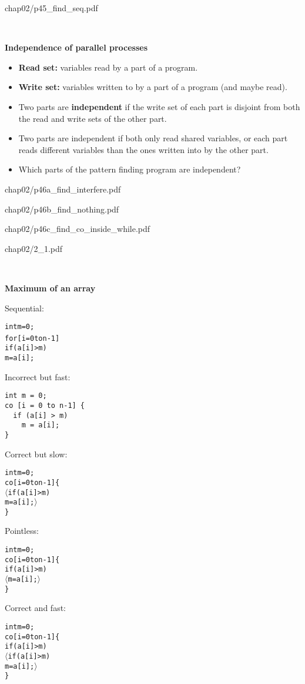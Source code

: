 \documentclass{article}
\newcommand{\lang}{\ensuremath{\langle}}
\newcommand{\rang}{\ensuremath{\rangle}}
\newcommand{\myfig}[1]{\begin{overpic}[scale=1.5]{#1}}
\newcommand{\myfigend}{\end{overpic}\newpage}
\newcommand{\bi}{\begin{itemize}}
\newcommand{\ii}{\item}
\newcommand{\ei}{\end{itemize}}
\newcommand{\ti}[1]{
\mbox{~}

\vspace{1.25in}
\centerline{\bf #1}}
\begin{document}
\newpage

\myfig{chap02/p45_find_seq.pdf}

\myfigend

\ti{Independence of parallel processes}
\bi
\ii {\bf Read set:}  variables read by a part of a program.
\ii {\bf Write set:}  variables written to by a part of a program (and
maybe read).
\ii Two parts are {\bf independent} if the write set of each part is
disjoint from both the read and write sets of the other part.
\ii Two parts are independent if both only read shared variables, or
each part reads different variables than the ones written into by the
other part.
\ii Which parts of the pattern finding program are independent?
\ei


\newpage
\myfig{chap02/p46a_find_interfere.pdf}
\myfigend
\myfig{chap02/p46b_find_nothing.pdf}
\myfigend
\myfig{chap02/p46c_find_co_inside_while.pdf}
\myfigend
\myfig{chap02/2_1.pdf}
\myfigend

\ti{Maximum of an array}
\begin{center}
Sequential:

\begin{minipage}{2in}
\begin{alltt}
int m = 0;
for [i = 0 to n-1] {
  if (a[i] > m)
    m = a[i];
}
\end{alltt}
\end{minipage}
\end{center}

\begin{multicols}{2}

{Incorrect but fast:}
\begin{verbatim}
int m = 0;
co [i = 0 to n-1] {
  if (a[i] > m)
    m = a[i];
}
\end{verbatim}

\vfill


{Correct but slow:}
\begin{alltt}
int m = 0;
co [i = 0 to n-1] \{
  \lang if (a[i] > m)
    m = a[i];\rang
\}
\end{alltt}

\columnbreak

{Pointless:}
\begin{alltt}
int m = 0;
co [i = 0 to n-1] \{
  if (a[i] > m)
    \lang m = a[i];\rang
\}
\end{alltt}

\vfill

{Correct and fast:}
\begin{alltt}
int m = 0;
co [i = 0 to n-1] \{
  if (a[i] > m)
    \lang if (a[i] > m)
      m = a[i];\rang
\}
\end{alltt}

\end{multicols}
\newpage
\end{document}
